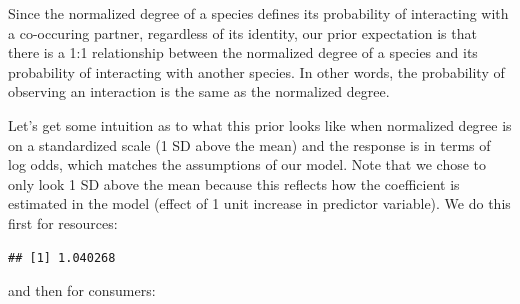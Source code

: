 \documentclass[11pt,]{article}
\newenvironment{Shaded}{}{}
\newcommand{\KeywordTok}[1]{\textcolor[rgb]{0.00,0.00,1.00}{#1}}
\newcommand{\DecValTok}[1]{#1}
\newcommand{\StringTok}[1]{\textcolor[rgb]{0.00,0.50,0.50}{#1}}
\newcommand{\CommentTok}[1]{\textcolor[rgb]{0.00,0.50,0.00}{#1}}
\newcommand{\OperatorTok}[1]{#1}
\newcommand{\NormalTok}[1]{#1}
\begin{document}
Since the normalized degree of a species defines its probability of
interacting with a co-occuring partner, regardless of its identity, our
prior expectation is that there is a 1:1 relationship between the
normalized degree of a species and its probability of interacting with
another species. In other words, the probability of observing an
interaction is the same as the normalized degree.

Let's get some intuition as to what this prior looks like when
normalized degree is on a standardized scale (1 SD above the mean) and
the response is in terms of log odds, which matches the assumptions of
our model. Note that we chose to only look 1 SD above the mean because
this reflects how the coefficient is estimated in the model (effect of 1
unit increase in predictor variable). We do this first for resources:

\begin{Shaded}
\end{Shaded}

\begin{verbatim}
## [1] 1.040268
\end{verbatim}

and then for consumers:
\end{document}
